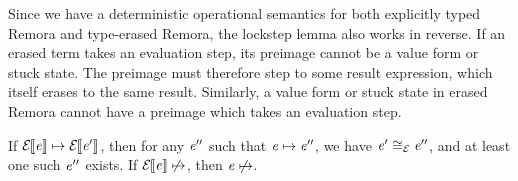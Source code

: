 Since we have a deterministic operational semantics for
both explicitly typed Remora and type-erased Remora,
the lockstep lemma also works in reverse.
If an erased term takes an evaluation step,
its preimage cannot be a value form or stuck state.
The preimage must therefore step to some result expression,
which itself erases to the same result.
Similarly, a value form or stuck state in erased Remora
cannot have a preimage which takes an evaluation step.

\begin{corollary}
If $\mathcal{E}{\hskip-.25em}\left\llbracket \mathit{e} \right\rrbracket \mapsto \mathcal{E}{\hskip-.25em}\left\llbracket \mathit{e}' \right\rrbracket$,
then for any $\mathit{e}''$ such that $\mathit{e} \mapsto \mathit{e}''$, we have $\mathit{e}' \cong_{\mathcal{E}} \mathit{e}''$,
and at least one such $\mathit{e}''$ exists.
If $\mathcal{E}{\hskip-.25em}\left\llbracket \mathit{e} \right\rrbracket \not\mapsto$, then $\mathit{e} \not\mapsto$.
\end{corollary}

